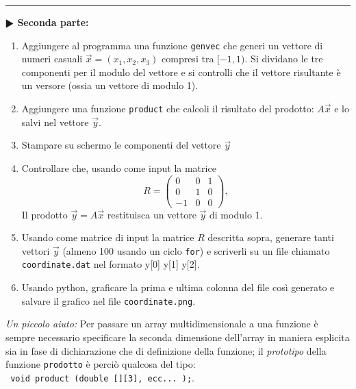 \documentclass[11pt]{article}
\begin{document}
\hrule
\vspace{2mm}
\textbf{$\RHD$ Seconda parte:}
\vspace{2mm}
\begin{enumerate}
\item
Aggiungere al programma una funzione \texttt{genvec} che generi un vettore di numeri casuali $\vec{x}=\left(x_1,x_2,x_3\right)$ 
compresi tra $[-1,1)$. Si dividano le tre componenti per il modulo del vettore e si controlli che il 
vettore risultante \`e un versore (ossia un vettore di modulo 1).
\item Aggiungere una funzione \texttt{product} che calcoli il risultato del prodotto: 
$A \vec{x}$ e lo salvi nel vettore $\vec{y}$.
\item Stampare su schermo le componenti del vettore $\vec{y}$
\item Controllare che, usando come input la matrice
\[
R = \left(\begin{array}{ccc}
 0 & 0 & 1\\
 0 & 1 & 0\\
-1 & 0 & 0
\end{array}
\right),
\]
Il prodotto $\vec{y}=A \vec{x}$ restituisca un vettore $\vec{y}$ di modulo 1.
\item Usando come matrice di input la matrice $R$ descritta sopra, generare tanti vettori $\vec{y}$ (almeno 100 usando un ciclo \texttt{for}) e scriverli su un file chiamato
\texttt{coordinate.dat} nel formato
y[0] y[1] y[2].\\
\item Usando python, graficare la prima e ultima colonna del file cos\`i generato e salvare il grafico nel file \texttt{coordinate.png}.
\end{enumerate}

\begin{mdframed}[backgroundcolor=gray!10]
{\em Un piccolo aiuto:} Per passare un array multidimensionale a una funzione \`{e} sempre necessario specificare la seconda  dimensione dell'array in maniera esplicita sia in fase di dichiarazione che di definizione della funzione;
il {\em prototipo} della funzione \texttt{prodotto} \`{e} perci\`{o} qualcosa del tipo:
\\
\texttt{
void product (double [][3], ecc... );}.

\end{mdframed}
\end{document}
